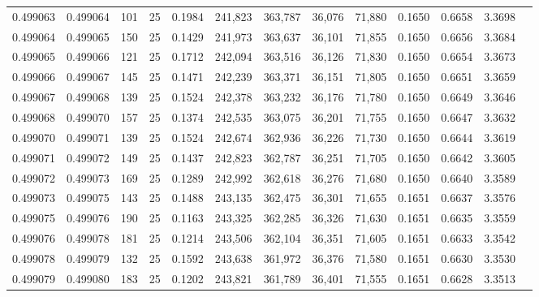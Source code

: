 \begin{tabular}{rrrrrrrrrrrrr}
0.499063 & 0.499064 & 101 &  25 &                                     0.1984 & 241,823 & 363,787 &  36,076 &  71,880 & 0.1650 & 0.6658 & 3.3698 \\
0.499064 & 0.499065 & 150 &  25 &                                     0.1429 & 241,973 & 363,637 &  36,101 &  71,855 & 0.1650 & 0.6656 & 3.3684 \\
0.499065 & 0.499066 & 121 &  25 &                                     0.1712 & 242,094 & 363,516 &  36,126 &  71,830 & 0.1650 & 0.6654 & 3.3673 \\
0.499066 & 0.499067 & 145 &  25 &                                     0.1471 & 242,239 & 363,371 &  36,151 &  71,805 & 0.1650 & 0.6651 & 3.3659 \\
0.499067 & 0.499068 & 139 &  25 &                                     0.1524 & 242,378 & 363,232 &  36,176 &  71,780 & 0.1650 & 0.6649 & 3.3646 \\
0.499068 & 0.499070 & 157 &  25 &                                     0.1374 & 242,535 & 363,075 &  36,201 &  71,755 & 0.1650 & 0.6647 & 3.3632 \\
0.499070 & 0.499071 & 139 &  25 &                                     0.1524 & 242,674 & 362,936 &  36,226 &  71,730 & 0.1650 & 0.6644 & 3.3619 \\
0.499071 & 0.499072 & 149 &  25 &                                     0.1437 & 242,823 & 362,787 &  36,251 &  71,705 & 0.1650 & 0.6642 & 3.3605 \\
0.499072 & 0.499073 & 169 &  25 &                                     0.1289 & 242,992 & 362,618 &  36,276 &  71,680 & 0.1650 & 0.6640 & 3.3589 \\
0.499073 & 0.499075 & 143 &  25 &                                     0.1488 & 243,135 & 362,475 &  36,301 &  71,655 & 0.1651 & 0.6637 & 3.3576 \\
0.499075 & 0.499076 & 190 &  25 &                                     0.1163 & 243,325 & 362,285 &  36,326 &  71,630 & 0.1651 & 0.6635 & 3.3559 \\
0.499076 & 0.499078 & 181 &  25 &                                     0.1214 & 243,506 & 362,104 &  36,351 &  71,605 & 0.1651 & 0.6633 & 3.3542 \\
0.499078 & 0.499079 & 132 &  25 &                                     0.1592 & 243,638 & 361,972 &  36,376 &  71,580 & 0.1651 & 0.6630 & 3.3530 \\
0.499079 & 0.499080 & 183 &  25 &                                     0.1202 & 243,821 & 361,789 &  36,401 &  71,555 & 0.1651 & 0.6628 & 3.3513 \\

\end{tabular}
